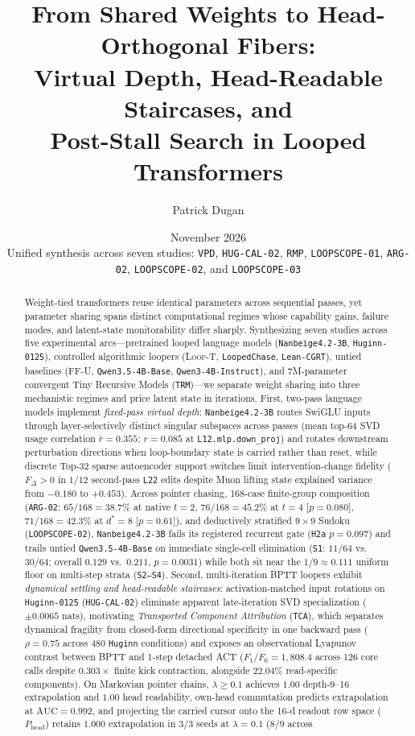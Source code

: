 \documentclass[10pt,letterpaper]{article}
\title{\bfseries From Shared Weights to Head-Orthogonal Fibers:\\[0.30em]
Virtual Depth, Head-Readable Staircases, and\\[0.14em]
Post-Stall Search in Looped Transformers}
\author{Patrick Dugan}
\date{November 2026\\[0.2em]\normalsize Unified synthesis across seven studies: \texttt{VPD}, \texttt{HUG-CAL-02}, \texttt{RMP}, \texttt{LOOPSCOPE-01}, \texttt{ARG-02}, \texttt{LOOPSCOPE-02}, and \texttt{LOOPSCOPE-03}}
\newcommand{\LoopT}{\textsc{Loop-T}}
\newcommand{\FFU}{\textsc{FF-U}}
\newcommand{\Phead}{P_{\mathrm{head}}}
\begin{document}
\maketitle
\vspace{-0.70em}

\begin{abstract}
\noindent
Weight-tied transformers reuse identical parameters across sequential passes, yet parameter sharing spans distinct computational regimes whose capability gains, failure modes, and latent-state monitorability differ sharply. Synthesizing seven studies across five experimental arcs—pretrained looped language models (\texttt{Nanbeige4.2-3B}, \texttt{Huginn-0125}), controlled algorithmic loopers (\LoopT, \texttt{LoopedChase}, \texttt{Lean-CGRT}), untied baselines (\FFU, \texttt{Qwen3.5-4B-Base}, \texttt{Qwen3-4B-Instruct}), and 7M-parameter convergent Tiny Recursive Models (\texttt{TRM})—we separate weight sharing into three mechanistic regimes and price latent state in iterations. First, two-pass language models implement \emph{fixed-pass virtual depth}: \texttt{Nanbeige4.2-3B} routes SwiGLU inputs through layer-selectively distinct singular subspaces across passes (mean top-64 SVD usage correlation $\bar{r}=0.355$; $r=0.085$ at \texttt{L12.mlp.down\_proj}) and rotates downstream perturbation directions when loop-boundary state is carried rather than reset, while discrete Top-32 sparse autoencoder support switches limit intervention-change fidelity ($F_\Delta > 0$ in $1/12$ second-pass \texttt{L22} edits despite Muon lifting state explained variance from $-0.180$ to $+0.453$). Across pointer chasing, 168-case finite-group composition (\texttt{ARG-02}: $65/168 = 38.7\%$ at native $t=2$, $76/168 = 45.2\%$ at $t=4$ [$p=0.080$], $71/168 = 42.3\%$ at $d^*=8$ [$p=0.61$]), and deductively stratified $9\times 9$ Sudoku (\texttt{LOOPSCOPE-02}), \texttt{Nanbeige4.2-3B} fails its registered recurrent gate (\texttt{H2a} $p=0.097$) and trails untied \texttt{Qwen3.5-4B-Base} on immediate single-cell elimination (\texttt{S1}: $11/64$ vs.\ $30/64$; overall $0.129$ vs.\ $0.211$, $p=0.0031$) while both sit near the $1/9 \approx 0.111$ uniform floor on multi-step strata (\texttt{S2--S4}). Second, multi-iteration BPTT loopers exhibit \emph{dynamical settling and head-readable staircases}: activation-matched input rotations on \texttt{Huginn-0125} (\texttt{HUG-CAL-02}) eliminate apparent late-iteration SVD specialization ($\pm 0.0065$ nats), motivating \emph{Transported Component Attribution} (\texttt{TCA}), which separates dynamical fragility from closed-form directional specificity in one backward pass ($\rho=0.75$ across 480 \texttt{Huginn} conditions) and exposes an observational Lyapunov contrast between BPTT and 1-step detached ACT ($F_1/F_6 = 1{,}808.4$ across 126 core calls despite $0.303\times$ finite kick contraction, alongside $22.04\%$ read-specific components). On Markovian pointer chains, $\lambda \ge 0.1$ achieves $1.00$ depth-9--16 extrapolation and $1.00$ head readability, own-head commutation predicts extrapolation at $\mathrm{AUC}=0.992$, and projecting the carried cursor onto the 16-d readout row space ($\Phead$) retains $1.000$ extrapolation in $3/3$ seeds at $\lambda=0.1$ ($8/9$ across 
\end{abstract}
\end{document}

